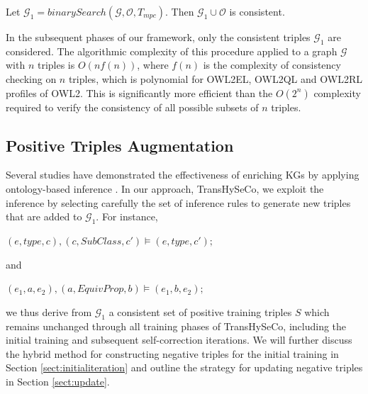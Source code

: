 \documentclass[sigconf]{acmart}
\newcommand{\TransHI}{TransHySeCo\xspace}
\begin{document}
\begin{proposition}\label{prop:inconsistencyremoval}Let 
  $\mathcal{G}_1= binarySearch(\mathcal{G},\mathcal{O},T_{mpc})$. Then $\mathcal{G}_1 \cup \mathcal{O}$ is consistent.
\end{proposition}


\noindent In the subsequent phases of our framework, only the consistent triples $\mathcal{G}_1$ are considered.
The algorithmic complexity of this procedure applied to a graph $\mathcal{G}$ with $n$ triples is $O(nf(n))$, where $f(n)$ is the complexity of consistency checking on $n$ triples, which is polynomial for OWL2EL, OWL2QL and OWL2RL profiles of OWL2. This is significantly more efficient than the $O(2^n)$ complexity required to verify the consistency of all possible subsets of $n$ triples.

\subsection{Positive Triples Augmentation}\label{sect:triple-augmentation} 
Several studies have demonstrated the effectiveness of enriching KGs by applying ontology-based inference \cite{positiveTripleAugmentationSource1}\cite{positiveTripleAugmentationSource2}\cite{positiveTripleAugmentationSource3}.  In our approach, \TransHI, we exploit the inference by selecting  carefully the set of inference rules to generate new triples that are added to  $\mathcal{G}_1$. For instance,
\begin{small}
$(e,type,c), (c,SubClass,c') \models (e,type,c');$
\end{small} and 
\begin{small}
$(e_1,a,e_2), (a,EquivProp,b) \models (e_1,b,e_2);$
\end{small}
we thus derive from $\mathcal{G}_1$ a consistent set of positive training triples  $S$ which remains unchanged through all training phases of \TransHI, including the initial training and subsequent self-correction iterations.
We will further discuss the hybrid method for constructing negative triples for the initial training in Section \ref{sect:initialiteration} and outline the strategy for updating negative triples in Section \ref{sect:update}.
\end{document}
